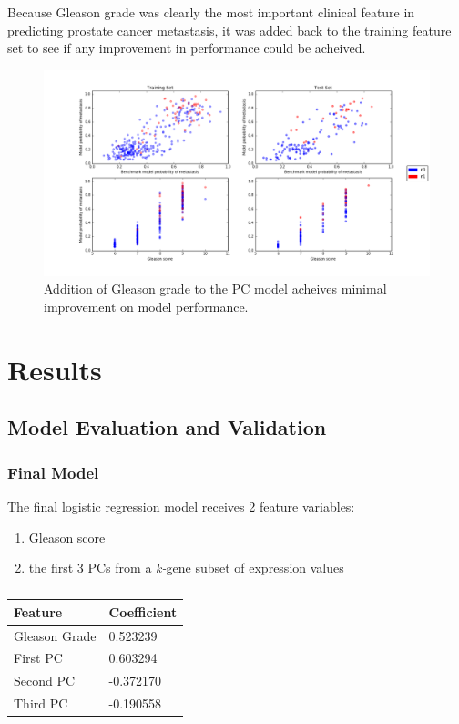 \documentclass[final]{article}
\begin{document}
Because Gleason grade was clearly the most important clinical feature in predicting
prostate cancer metastasis, it was added back to the training feature set to see
if any improvement in performance could be acheived.

\begin{figure}[h!]
  \centering
  \includegraphics[width=\textwidth]{PC3Gleason}
  \caption{\label{fig:PC3GG}Addition of Gleason grade to the PC model acheives minimal improvement on model performance.}
\end{figure}

\section{Results}

\subsection{Model Evaluation and Validation}

\subsubsection{Final Model}

The final logistic regression model receives 2 feature variables:

\begin{enumerate}
\item Gleason score
\item the first 3 PCs from a \textit{k-}gene subset of expression values
\end{enumerate}

\begin{table}
  \centering
  \caption{\label{tab:FFcoefs}}
    \begin{tabular}{l l}
      \hline
      Feature & Coefficient \\ \hline
      Gleason Grade & 0.523239  \\
      First PC & 0.603294 \\
      Second PC & -0.372170  \\
      Third PC &  -0.190558 \\
      \hline
    \end{tabular}
\end{table}
\end{document}
